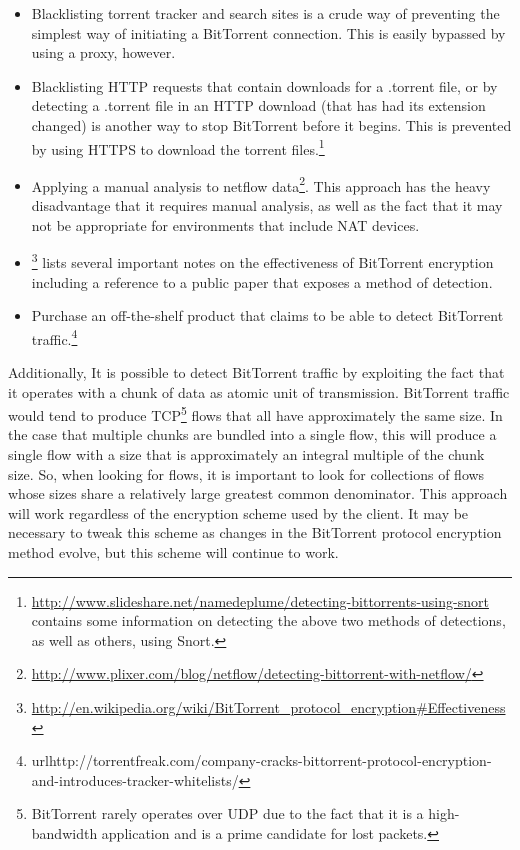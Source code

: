 \documentclass{article}
\theoremstyle{remark}
\theoremstyle{definition}
\theoremstyle{definition}
\theoremstyle{definition}
\begin{document}
\begin{itemize}
\item Blacklisting torrent tracker and search sites is a crude way of preventing the simplest way of initiating a BitTorrent connection. This is easily bypassed by using a proxy, however.
\item Blacklisting HTTP requests that contain downloads for a .torrent file, or by detecting a .torrent file in an HTTP download (that has had its extension changed) is another way to stop BitTorrent before it begins. This is prevented by using HTTPS to download the torrent files.\footnote{\url{http://www.slideshare.net/namedeplume/detecting-bittorrents-using-snort} contains some information on detecting the above two methods of detections, as well as others, using Snort.}
\item Applying a manual analysis to netflow data\footnote{\url{http://www.plixer.com/blog/netflow/detecting-bittorrent-with-netflow/}}. This approach has the heavy disadvantage that it requires manual analysis, as well as the fact that it may not be appropriate for environments that include NAT devices.
\item \footnote{\url{http://en.wikipedia.org/wiki/BitTorrent_protocol_encryption\#Effectiveness}} lists several important notes on the effectiveness of BitTorrent encryption including a reference to a public paper that exposes a method of detection.
\item Purchase an off-the-shelf product that claims to be able to detect BitTorrent traffic.\footnote{url{http://torrentfreak.com/company-cracks-bittorrent-protocol-encryption-and-introduces-tracker-whitelists/}}
\end{itemize}

Additionally, It is possible to detect BitTorrent traffic by exploiting the fact that it operates with a chunk of data as atomic unit of transmission. BitTorrent traffic would tend to produce TCP\footnote{BitTorrent rarely operates over UDP due to the fact that it is a high-bandwidth application and is a prime candidate for lost packets.} flows that all have approximately the same size. In the case that multiple chunks are bundled into a single flow, this will produce a single flow with a size that is approximately an integral multiple of the chunk size. So, when looking for flows, it is important to look for collections of flows whose sizes share a relatively large greatest common denominator. This approach will work regardless of the encryption scheme used by the client. It may be necessary to tweak this scheme as changes in the BitTorrent protocol encryption method evolve, but this scheme will continue to work.
\end{document}
